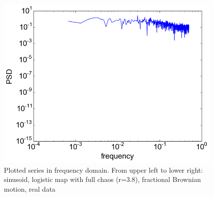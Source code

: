 \documentclass[12pt]{article}
\begin{document}
\begin{figure}
  \includegraphics[scale=0.4]{spectrum_vr}
  \caption{Plotted series in frequency domain. From upper left to lower right: sinusoid, logistic map with full chaos (r=3.8), fractional Brownian motion, real data}
  \label{fig:stack_ts_spectra}
\end{figure}
\end{document}
